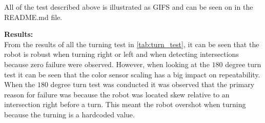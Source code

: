 \documentclass[../report.tex]{subfiles}
\begin{document}
All of the test described above is illustrated as GIFS and can be seen on \cite{code} in the README.md file. 

\textbf{Results:}\\
From the results of all the turning test in \autoref{tab:turn_test}, it can be seen that the robot is robust when turning right or left and when detecting intersections because zero failure were observed. However, when looking at the $180$ degree turn test it can be seen that the color sensor scaling has a big impact on repeatability. When the $180$ degree turn test was conducted it was observed that the primary reason for failure was because the robot was located skew relative to an intersection right before a turn. This meant the robot overshot when turning because the turning is a hardcoded value. 

\end{document}
